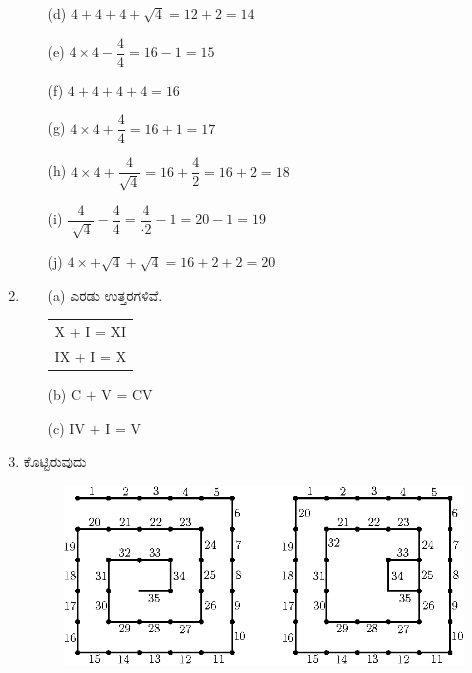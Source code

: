 \begin{enumerate}
\begin{itemize}
\smallskip

\item[(d)] $4 + 4 + 4 + \sqrt{4} = 12 + 2 = 14$

\smallskip

\item[(e)] $4\times 4 - \dfrac{4}{4} = 16 - 1 = 15$

\smallskip

\item[(f)] $4+4+4+4 = 16$

\smallskip

\item[(g)] $4\times 4 + \dfrac{4}{4} = 16 + 1 = 17$

\smallskip

\item[(h)] $4\times 4 + \dfrac{4}{\sqrt{4}} = 16 + \dfrac{4}{2} = 16 + 2 = 18$

\smallskip

\item[(i)] $\dfrac{4}{\sqrt[\cdot]{4}} - \dfrac{4}{4} = \dfrac{4}{\cdot 2} - 1 = 20 - 1 = 19$

\smallskip

\item[(j)] $4\times + \sqrt{4} + \sqrt{4} = 16 + 2 + 2 = 20$
\end{itemize}

\item 
\begin{itemize}
\item[(a)] ಎರಡು ಉತ್ತರಗಳಿವೆ. 
\begin{tabular}[t]{l}
X + I = XI\\
IX + I = X
\end{tabular}
\item[(b)] C $+$ V = CV
\item[(c)] IV $+$ I = V 
\end{itemize}

\item ಕೊಟ್ಟಿರುವುದು 

\begin{figure}[H]
\centering
\includegraphics{images/chap12/ans8.eps}


\end{figure}
\end{enumerate}
